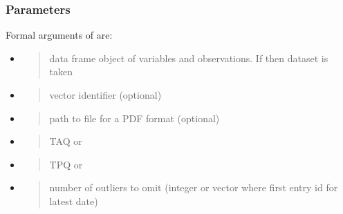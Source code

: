 \documentclass[a4paper,12pt,english]{sphinxhowto}
\begin{document}
\subsubsection{Parameters}
\label{\detokenize{Time:parameters}}
Formal arguments of  are:
\begin{itemize}
\item {} 
\begin{quote}

data frame object of variables and observations. If  then  dataset is taken
\end{quote}

\item {} 
\begin{quote}

vector identifier (optional)
\end{quote}

\item {} 
\begin{quote}

path to file for a PDF format (optional)
\end{quote}

\item {} 
\begin{quote}

TAQ or 
\end{quote}

\item {} 
\begin{quote}

TPQ or 
\end{quote}

\item {} 
\begin{quote}

number of outliers to omit (integer or vector where first entry id for latest date)
\end{quote}

\end{itemize}
\end{document}
